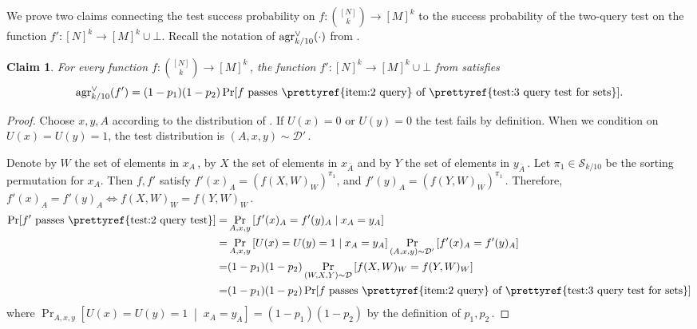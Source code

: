 \documentclass[11pt]{article}
\numberwithin{equation}{section}
\newtheorem{claim}[theorem]{Claim}
\theoremstyle{definition}
\theoremstyle{plain}
\newcommand{\Prob}[2][]{\Pr_{{#1}}\left[#2\right]} %
\newcommand{\given}{\;\middle\vert\;} %
\newcommand\f{f} %
\newcommand\setf{f} %
\newcommand{\test}[2]{
	\ifx &#2&
	\textrm{agr}^{#1}
	\else	
	\textrm{agr}^{#1}_{#2}
	\fi}
\newcommand{\sets}{\binom{[N]}{k}} %
\newcommand\rest[1]{{\bar{#1}}}  %
\begin{document}
We prove two claims connecting the test success probability on $\setf:\sets\rightarrow[M]^k$ %
to the success probability of the %
two-query  %
test on the function $\f':[N]^k\rightarrow[M]^k\cup\bot$.  Recall the notation of  $\test{\vee}{k/10}(\cdot)$ from .
\begin{claim} \label{claim:set to tuples func}
	For every function $\setf:\sets\rightarrow[M]^k$\,, the function $\f':[N]^k\rightarrow[M]^k\cup\bot$ from  satisfies
%
%
%
	\[ \test{\vee}{k/10}(\f') = (1-p_1)(1-p_2)\Pr[\setf \text{ passes
 \prettyref{item:2 query}  of \prettyref{test:3 query test for sets}}].\]

\end{claim}
\begin{proof}
	Choose $x,y,A$ according to the distribution of .
	If $U(x)=0$ or $U(y)=0$ the test fails by definition. When we condition on $U(x)=U(y)=1$, the test distribution is $(A,x,y)\sim\mathcal{D}'$\,. 
	
	Denote by $W$ the set of elements in $x_A$\,, by $X$ the set of elements in $x_\rest{A}$ and by $Y$ the set of elements in $y_\rest{A}$\,. Let $\pi_1\in \mathcal{S}_{k/10}$ be the sorting permutation for $x_A$. Then $\f,\f'$ satisfy $\f'(x)_A = (\setf(X,W)_W)^{\pi_1}$, and $\f'(y)_A = (\setf(Y,W)_W)^{\pi_1}$\,. Therefore, $\f'(x)_A=\f'(y)_A\iff \setf(X,W)_W=\setf(Y,W)_W$\,.
	\begin{align*}
\Pr[\f' \text{ passes \prettyref{test:2 query test}}] %
=& \Prob[A,x,y]{\f'(x)_A = \f'(y)_A \given x_A=y_A} \\
	=&\Prob[A,x,y]{U(x)=U(y)=1 \given x_A=y_A}\Prob[(A,x,y)\sim\mathcal{D'}]{\f'(x)_A=\f'(y)_A} \\
	=&(1-p_1)(1-p_2)\Prob[(W,X,Y)\sim\mathcal{D}]{\setf(X,W)_W=\setf(Y,W)_W} \\
	=&(1-p_1)(1-p_2)\Pr[\setf \text{ passes  \prettyref{item:2 query}  of \prettyref{test:3 query test for sets}}]%
\end{align*}
%
where  %
$\Prob[A,x,y]{U(x)=U(y)=1 \given x_A=y_A}=(1-p_1)(1-p_2)$ by the definition of $p_1,p_2$\,.
%
\end{proof}
\end{document}
